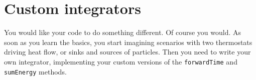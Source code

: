 \section{Custom integrators}

You would like your code to do something different. Of course you would. As soon 
as you learn the basics, you start imagining scenarios with two thermostats 
driving heat flow, or sinks and sources of particles. Then you need to write 
your own integrator, implementing your custom versions of the 
\texttt{forwardTime} and \texttt{sumEnergy} methods.

